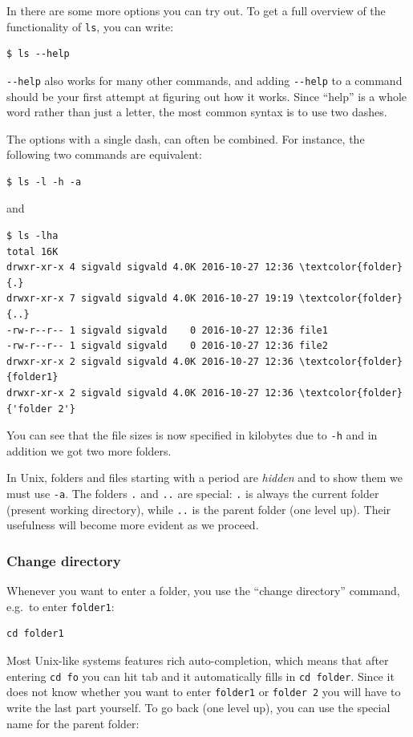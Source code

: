In  there are some more options you can try out. To get a full overview of the functionality of \verb|ls|, you can write:

\begin{verbatim}
$ ls --help
\end{verbatim}

\verb|--help| also works for many other commands, and adding \verb|--help| to a command should be your first attempt at figuring out how it works. Since ``help'' is a whole word rather than just a letter, the most common syntax is to use two dashes.

The options with a single dash, can often be combined. For instance, the following two commands are equivalent:

\begin{verbatim}
$ ls -l -h -a
\end{verbatim}
and

\begin{Verbatim}[commandchars=\\\{\}]
$ ls -lha
total 16K
drwxr-xr-x 4 sigvald sigvald 4.0K 2016-10-27 12:36 \textcolor{folder}{.}
drwxr-xr-x 7 sigvald sigvald 4.0K 2016-10-27 19:19 \textcolor{folder}{..}
-rw-r--r-- 1 sigvald sigvald    0 2016-10-27 12:36 file1
-rw-r--r-- 1 sigvald sigvald    0 2016-10-27 12:36 file2
drwxr-xr-x 2 sigvald sigvald 4.0K 2016-10-27 12:36 \textcolor{folder}{folder1}
drwxr-xr-x 2 sigvald sigvald 4.0K 2016-10-27 12:36 \textcolor{folder}{'folder 2'}
\end{Verbatim}
\ignore{$}
You can see that the file sizes is now specified in kilobytes due to \verb|-h| and in addition we got two more folders.

In Unix, folders and files starting with a period are \emph{hidden} and to show them we must use \verb|-a|. The folders \verb|.| and \verb|..| are special: \verb|.| is always the current folder (present working directory), while \verb|..| is the parent folder (one level up). Their usefulness will become more evident as we proceed.

\subsubsection{Change directory}

Whenever you want to enter a folder, you use the ``change directory'' command, e.g.\ to enter \verb|folder1|:

\begin{verbatim}
cd folder1
\end{verbatim}
Most Unix-like systems features rich auto-completion, which means that after entering \verb|cd fo| you can hit tab and it automatically fills in \verb|cd folder|. Since it does not know whether you want to enter \verb|folder1| or \verb|folder 2| you will have to write the last part yourself. To go back (one level up), you can use the special name for the parent folder:

